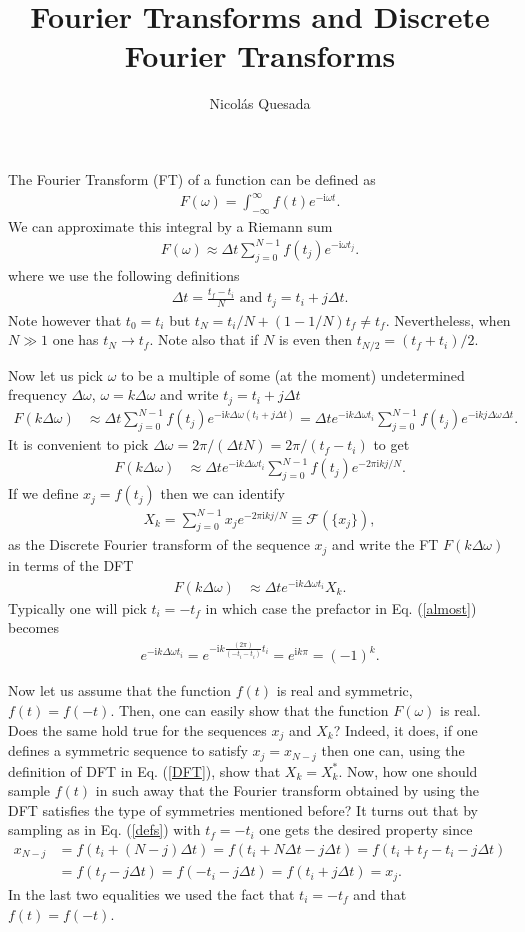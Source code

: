 \documentclass[english,12pt]{shreyasnotes}
\title{Fourier Transforms and Discrete Fourier Transforms}
\author{Nicol\'as Quesada}
\newcommand{\ii}{\mathrm{i}}
\newcommand{\eq}[1]{\begin{align}#1\end{align}}
\begin{document}
\maketitle
The Fourier Transform (FT) of a function can be defined as
\eq{
F(\omega)=\int_{-\infty}^\infty f(t) e^{-\ii \omega t}.
}
We can approximate this integral by a Riemann sum
\eq{
F(\omega) \approx \Delta t \sum_{j=0}^{N-1} f(t_j) e^{-\ii \omega t_j}.
}
where we use the following definitions
\eq{\label{defs}
\Delta t=\frac{t_f-t_i}{N} \text{ and } t_j=t_i+j \Delta t.
}
Note however that $t_0=t_i$ but $t_N=t_i/N+(1-1/N) t_f \neq t_f$. Nevertheless, when $N \gg 1$ one has $t_N \to t_f$. Note also that if $N$ is even then $t_{N/2}=(t_f+t_i)/2$. 

Now let us pick $\omega$ to be a multiple of some (at the moment) undetermined frequency $\Delta \omega$, $\omega=k \Delta \omega$ and write $t_j=t_i+j \Delta t$
\eq{
F(k \Delta \omega)&\approx \Delta t\sum_{j=0}^{N-1} f(t_j) e^{-\ii k \Delta \omega (t_i+j \Delta t)}=\Delta t e^{-\ii k \Delta \omega t_i}\sum_{j=0}^{N-1} f(t_j) e^{-\ii k j \Delta \omega  \Delta t}.
}
It is convenient to pick $\Delta \omega = 2 \pi/(\Delta t N)=2 \pi /(t_f-t_i)$ to get
\eq{\label{almost}
F(k \Delta \omega)&\approx \Delta t e^{-\ii k \Delta \omega t_i}\sum_{j=0}^{N-1} f(t_j) e^{-2 \pi \ii k  j/N}.
}
If we define $x_j=f(t_j)$ then we can identify
\eq{\label{DFT}
X_k=\sum_{j=0}^{N-1} x_j e^{-2 \pi \ii k  j/N}\equiv \mathcal{F}\left(\{x_j \}\right),
}
as the Discrete Fourier transform of the sequence $x_j$ and write the FT  $F(k \Delta \omega)$ in terms of the DFT
\eq{\label{quasi}
F(k \Delta \omega)&\approx \Delta t e^{-\ii k \Delta \omega t_i} X_k.
}
Typically one will pick $t_i=-t_f$ in which case the prefactor in Eq. (\ref{almost}) becomes
\eq{
e^{-\ii k \Delta \omega t_i}=e^{-\ii k \frac{(2 \pi)}{(-t_i-t_i)} t_i}=e^{\ii k \pi}=(-1)^k.
}

Now let us assume that the function $f(t)$ is real and symmetric, $f(t)=f(-t)$. Then, one can easily show that the function $F(\omega)$ is real. Does the same hold true for the sequences $x_j$ and $X_k$? Indeed, it does, if one defines a symmetric sequence to satisfy $x_j=x_{N-j}$ then one can, using the definition of DFT in Eq. (\ref{DFT}), show that $X_k=X_k^*$. Now, how one should sample $f(t)$ in such away that the Fourier transform obtained by using the DFT satisfies the type of symmetries mentioned before?
It turns out that by sampling as in Eq. (\ref{defs}) with $t_f=-t_i$ one gets the desired property since
\eq{
x_{N-j}&=f(t_i+(N-j)\Delta t)=f(t_i+N\Delta t-j\Delta t)=f(t_i+t_f-t_i-j \Delta t  )\\
&=f(t_f-j\Delta t )=f(-t_i-j \Delta t )=f(t_i+j \Delta t )=x_j. \nonumber
}
In the last two equalities we used the fact that $t_i=-t_f$ and that $f(t)=f(-t)$.
\end{document}
